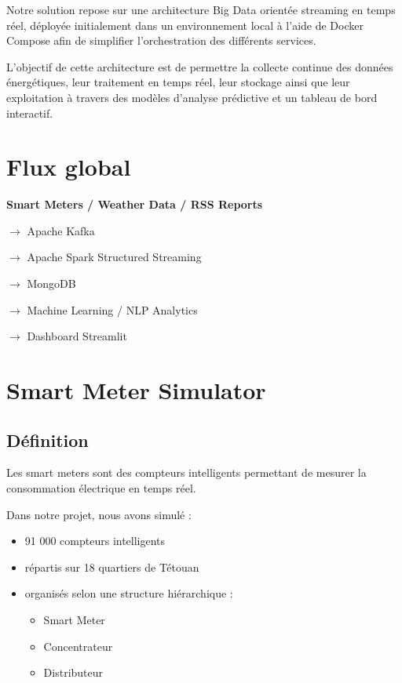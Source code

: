 \documentclass[1pt,a4paper]{report}
\begin{document}
Notre solution repose sur une architecture Big Data orientée streaming en temps réel, déployée initialement dans un environnement local à l’aide de Docker Compose afin de simplifier l’orchestration des différents services.

L’objectif de cette architecture est de permettre la collecte continue des données énergétiques, leur traitement en temps réel, leur stockage ainsi que leur exploitation à travers des modèles d’analyse prédictive et un tableau de bord interactif.

\section{Flux global}

\textbf{Smart Meters / Weather Data / RSS Reports}

$\rightarrow$ Apache Kafka

$\rightarrow$ Apache Spark Structured Streaming

$\rightarrow$ MongoDB

$\rightarrow$ Machine Learning / NLP Analytics

$\rightarrow$ Dashboard Streamlit

\section{Smart Meter Simulator}

\subsection{Définition}

Les smart meters sont des compteurs intelligents permettant de mesurer la consommation électrique en temps réel.

Dans notre projet, nous avons simulé :

\begin{itemize}
    \item 91 000 compteurs intelligents
    \item répartis sur 18 quartiers de Tétouan
    \item organisés selon une structure hiérarchique :
    \begin{itemize}
        \item Smart Meter
        \item Concentrateur
        \item Distributeur
    \end{itemize}
\end{itemize}
\end{document}
